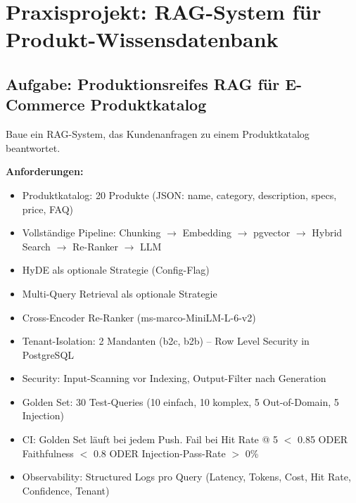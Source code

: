 \section{Praxisprojekt: RAG-System für Produkt-Wissensdatenbank}


\subsection{Aufgabe: Produktionsreifes RAG für E-Commerce Produktkatalog}

Baue ein RAG-System, das Kundenanfragen zu einem Produktkatalog beantwortet.

\textbf{Anforderungen:}
\begin{itemize}[leftmargin=*]
    \item Produktkatalog: 20 Produkte (JSON: name, category, description, specs, price, FAQ)
    \item Vollständige Pipeline: Chunking $\to$ Embedding $\to$ pgvector $\to$ Hybrid Search $\to$ Re-Ranker $\to$ LLM
    \item HyDE als optionale Strategie (Config-Flag)
    \item Multi-Query Retrieval als optionale Strategie
    \item Cross-Encoder Re-Ranker (ms-marco-MiniLM-L-6-v2)
    \item Tenant-Isolation: 2 Mandanten (b2c, b2b) -- Row Level Security in PostgreSQL
    \item Security: Input-Scanning vor Indexing, Output-Filter nach Generation
    \item Golden Set: 30 Test-Queries (10 einfach, 10 komplex, 5 Out-of-Domain, 5 Injection)
    \item CI: Golden Set läuft bei jedem Push. Fail bei Hit Rate @ 5 $<$ 0.85 ODER Faithfulness $<$ 0.8 ODER Injection-Pass-Rate $>$ 0\%
    \item Observability: Structured Logs pro Query (Latency, Tokens, Cost, Hit Rate, Confidence, Tenant)
\end{itemize}

